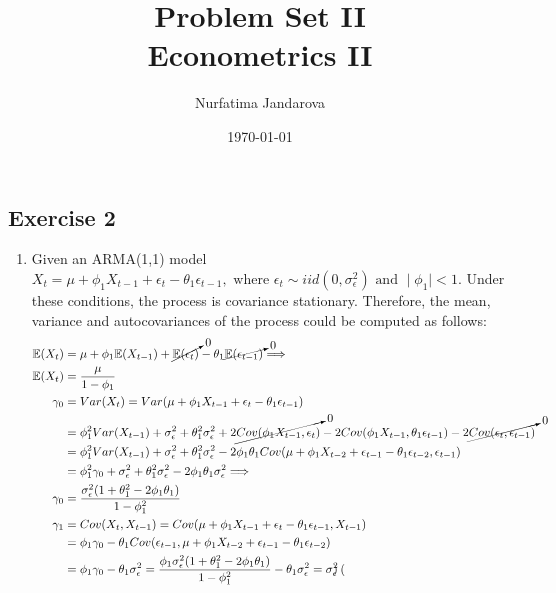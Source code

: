 \documentclass[]{article}
\title{Problem Set II \\ \large Econometrics II}
\author{Nurfatima Jandarova}
\date{\today}
\begin{document}
\maketitle

\subsection*{Exercise 2}
\begin{enumerate}[label=\alph*)]
	\item Given an ARMA(1,1) model $X_t = \mu + \phi_1 X_{t-1} + \epsilon_t - \theta_1\epsilon_{t-1}, \text{ where }\epsilon_t \sim iid(0, \sigma^2_\epsilon) \text{ and } \mid\phi_1\mid<1$.
	Under these conditions, the process is covariance stationary. Therefore, the mean, variance and autocovariances of the process could be computed as follows:
	\begin{equation}
		\begin{split}
		\mathbb{E}(X_{t})& = \mu + \phi_1\mathbb{E}(X_{t-1}) + \cancelto{0}{\mathbb{E}(\epsilon_t)} - \theta_1\cancelto{0}{\mathbb{E}(\epsilon_{t-1})} \Longrightarrow \\ \nonumber
		\mathbb{E}(X_{t})& = \frac{\mu}{1-\phi_1}\\
		\gamma_0& = Var(X_t) = Var(\mu + \phi_1 X_{t-1} + \epsilon_t - \theta_1\epsilon_{t-1}) \\
		& = \phi_1^2Var(X_{t-1}) + \sigma^2_\epsilon + \theta_1^2\sigma^2_\epsilon + 2\cancelto{0}{Cov(\phi_1 X_{t-1},\epsilon_t)} - 2Cov(\phi_1 X_{t-1}, \theta_1\epsilon_{t-1}) - 2\cancelto{0}{Cov(\epsilon_t, \epsilon_{t-1})} \\
		& = \phi_1^2Var(X_{t-1}) + \sigma^2_\epsilon + \theta_1^2\sigma^2_\epsilon - 2\phi_1\theta_1 Cov(\mu + \phi_1 X_{t-2} + \epsilon_{t-1} - \theta_1\epsilon_{t-2},\epsilon_{t-1}) \\
		& = \phi_1^2\gamma_0 + \sigma^2_\epsilon + \theta_1^2\sigma^2_\epsilon - 2\phi_1\theta_1\sigma^2_\epsilon \Longrightarrow \\
		\gamma_0& = \frac{\sigma^2_\epsilon(1 + \theta_1^2 - 2\phi_1\theta_1)}{1-\phi_1^2} \\
		\gamma_1& = Cov(X_t, X_{t-1}) = Cov(\mu + \phi_1 X_{t-1} + \epsilon_t - \theta_1\epsilon_{t-1}, X_{t-1}) \\
		& = \phi_1\gamma_0 - \theta_1 Cov(\epsilon_{t-1}, \mu + \phi_1 X_{t-2} + \epsilon_{t-1} - \theta_1\epsilon_{t-2}) \\
		& = \phi_1\gamma_0 - \theta_1 \sigma^2_\epsilon = \frac{\phi_1\sigma^2_\epsilon(1 + \theta_1^2 - 2\phi_1\theta_1)}{1-\phi_1^2} - \theta_1 \sigma^2_\epsilon = \sigma^2_\epsilon\begin{pmatrix}

\end{pmatrix}
\end{split}
\end{equation}
\end{enumerate}
\end{document}
